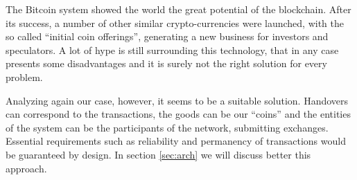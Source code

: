 The Bitcoin system showed the world the great potential of the blockchain. After its success, a number of other similar crypto-currencies were launched, with the so called ``initial coin offerings'', generating a new business for investors and speculators. A lot of hype is still surrounding this technology, that in any case presents some disadvantages and it is surely not the right solution for every problem. 

Analyzing again our case, however, it seems to be a suitable solution. Handovers can correspond to the transactions, the goods can be our ``coins'' and the entities of the system can be the participants of the network, submitting exchanges. Essential requirements such as reliability and permanency of transactions would be guaranteed by design. In section \ref{sec:arch} we will discuss better this approach.


